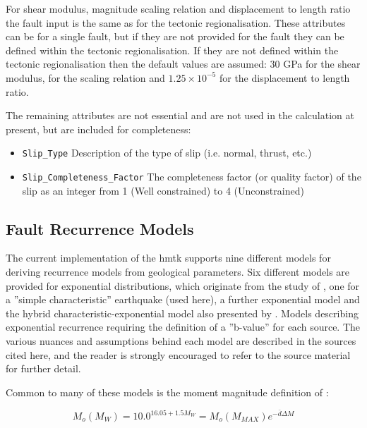 For shear modulus, magnitude scaling relation and displacement to length ratio the fault input is the same as for the tectonic regionalisation. These attributes can be for a single fault, but if they are not provided for the fault they can be defined within the tectonic regionalisation. If they are not defined within the tectonic regionalisation then the default values are assumed: 30 GPa for the shear modulus, \textcite{wells1994} for the scaling relation and $1.25\times10^{-5}$ for the displacement to length ratio. 

The remaining attributes are not essential and are not used in the calculation at present, but are included for completeness:
\begin{itemize}
\item \verb=Slip_Type= Description of the type of slip (i.e. normal, thrust, etc.)
\item \verb=Slip_Completeness_Factor= The completeness factor (or quality factor) of the slip as an integer from 1 (Well constrained) to 4 (Unconstrained) 
\end{itemize}


\subsection{Fault Recurrence Models}

The current implementation of the hmtk supports nine different models for deriving recurrence models from geological parameters. Six different models are provided for exponential distributions, which originate from the study of \textcite{AndersonLuco1983}, one for a ''simple characteristic'' earthquake (used here), a further exponential model \parencite{YoungsCoppersmith1985} and the hybrid characteristic-exponential model also presented by \textcite{YoungsCoppersmith1985}. Models describing exponential recurrence requiring the definition of a ''b-value'' for each source. The various nuances and assumptions behind each model are described in the sources cited here, and the reader is strongly encouraged to refer to the source material for further detail.

Common to many of these models is the moment magnitude definition of \textcite{HanksKanamori1979}:

\begin{equation}
M_o \left( {M_W} \right) = 10.0 ^{16.05 + 1.5 M_W} = M_o \left( {M_{MAX}} \right) e^{-\bar{d} \Delta M}
\end{equation}

